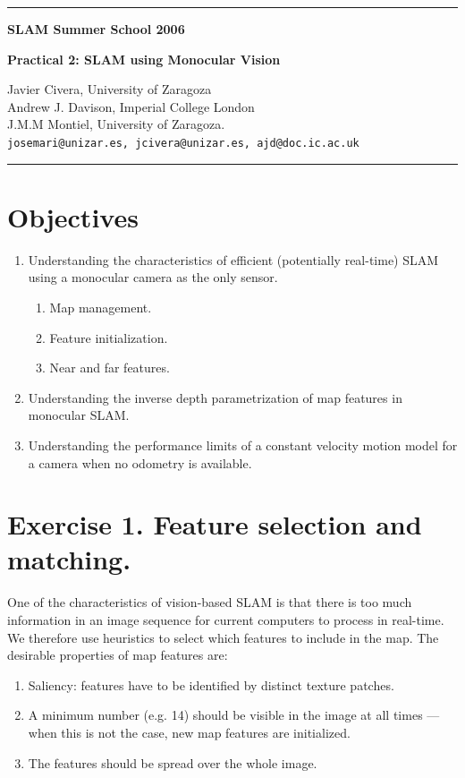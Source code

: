 \documentclass[a4paper,12pt]{article}
\makeatletter
\newcommand{\coursetitle}{SLAM Summer School 2006}
\newcommand{\tutorialtitle}{Practical 2: SLAM using Monocular Vision}
\newcommand{\docauthor}{Javier Civera, University of Zaragoza\\
                        Andrew J. Davison, Imperial College London\\
                        J.M.M Montiel, University of Zaragoza.}
\newcommand{\docemails}{josemari@unizar.es, jcivera@unizar.es, ajd@doc.ic.ac.uk}
\makeatother
\begin{document}



\begin{center}

\hrule
\vspace{2mm}
{\LARGE\bf \coursetitle}

\vspace{2mm}
{\Large\bf \tutorialtitle}

\vspace{2mm}
{\large \docauthor}
\\
{\large \texttt{\docemails}}


\end{center}


\hrule

\vspace{5mm}




\setcounter{page}{1}
\setcounter{section}{0}



\section{Objectives}
\begin{enumerate}
\item Understanding the characteristics of efficient (potentially
real-time) SLAM using a monocular
camera as the only sensor.
\begin{enumerate}
\item Map management.
\item Feature initialization.
\item Near and far features.
\end{enumerate}
\item Understanding the inverse depth parametrization of map
features in monocular SLAM.
\item Understanding the performance
limits of a constant velocity motion model for a camera when no odometry is available.
\end{enumerate}


\section{Exercise 1. Feature selection and matching.}
One of the characteristics of vision-based SLAM is that there is too
much information in an image sequence for
current computers to process in real-time. We therefore use heuristics to select which features to
include in the map. The desirable properties of map
features are:
\begin{enumerate}
\item Saliency: features have to be identified by distinct texture patches.
\item A minimum number (e.g. 14) should  be visible in the image at all times --- when this is not the case, 
new map features are initialized.
\item The features should be spread over the whole image.
\end{enumerate}
\end{document}
